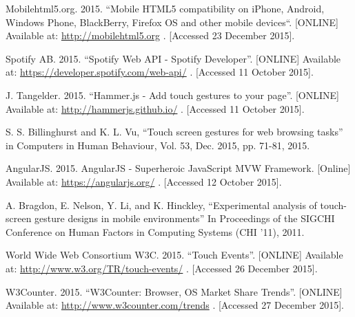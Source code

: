 \documentclass[conference]{IEEEtran}
\begin{document}
%
%
%
\begin{thebibliography}{1}

Mobilehtml5.org. 2015. ``Mobile HTML5 compatibility on iPhone, Android, Windows Phone, BlackBerry, Firefox OS and other mobile devices``. [ONLINE] Available at: \url{http://mobilehtml5.org} . [Accessed 23 December 2015].

Spotify AB. 2015. ``Spotify Web API - Spotify Developer''. [ONLINE] Available at: \url{https://developer.spotify.com/web-api/} . [Accessed 11 October 2015].

J. Tangelder. 2015. ``Hammer.js - Add touch gestures to your page''. [ONLINE] Available at: \url{http://hammerjs.github.io/} . [Accessed 11 October 2015].

S. S. Billinghurst and K. L. Vu, ``Touch screen gestures for web browsing tasks'' in Computers in Human Behaviour, Vol. 53, Dec. 2015, pp. 71-81, 2015.

AngularJS. 2015. AngularJS - Superheroic JavaScript MVW Framework. [Online] Available at: \url{https://angularjs.org/} . [Accessed 12 October 2015].

A. Bragdon, E. Nelson, Y. Li, and K. Hinckley, ``Experimental analysis of touch-screen gesture designs in mobile environments'' In Proceedings of the SIGCHI Conference on Human Factors in Computing Systems (CHI '11), 2011.

World Wide Web Consortium W3C. 2015. ``Touch Events''. [ONLINE] Available at: \url{http://www.w3.org/TR/touch-events/} . [Accessed 26 December 2015].

W3Counter. 2015. ``W3Counter: Browser, OS Market Share Trends''. [ONLINE] Available at: \url{http://www.w3counter.com/trends} . [Accessed 27 December 2015].


\end{thebibliography}
\end{document}
